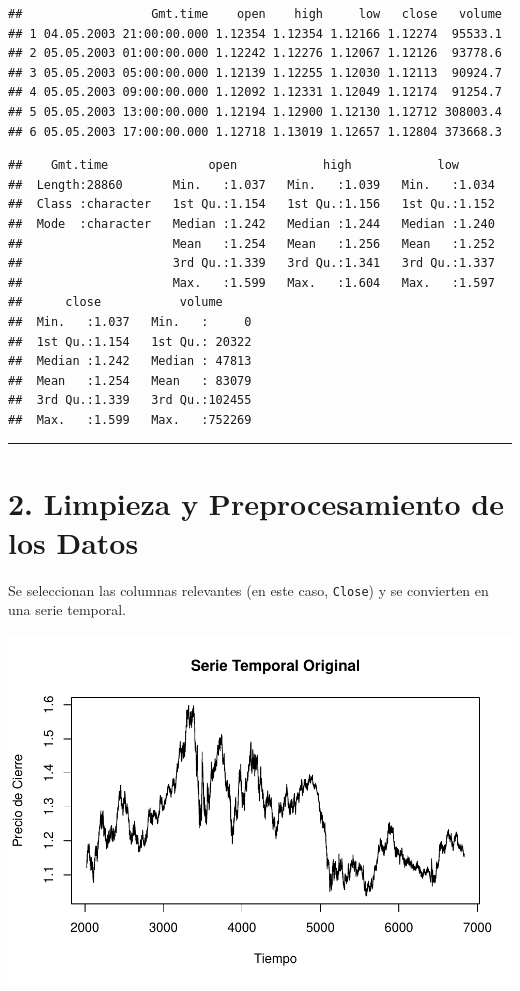 \documentclass[
]{book}
\begin{document}
\begin{verbatim}
##                  Gmt.time    open    high     low   close   volume
## 1 04.05.2003 21:00:00.000 1.12354 1.12354 1.12166 1.12274  95533.1
## 2 05.05.2003 01:00:00.000 1.12242 1.12276 1.12067 1.12126  93778.6
## 3 05.05.2003 05:00:00.000 1.12139 1.12255 1.12030 1.12113  90924.7
## 4 05.05.2003 09:00:00.000 1.12092 1.12331 1.12049 1.12174  91254.7
## 5 05.05.2003 13:00:00.000 1.12194 1.12900 1.12130 1.12712 308003.4
## 6 05.05.2003 17:00:00.000 1.12718 1.13019 1.12657 1.12804 373668.3
\end{verbatim}

\begin{verbatim}
##    Gmt.time              open            high            low       
##  Length:28860       Min.   :1.037   Min.   :1.039   Min.   :1.034  
##  Class :character   1st Qu.:1.154   1st Qu.:1.156   1st Qu.:1.152  
##  Mode  :character   Median :1.242   Median :1.244   Median :1.240  
##                     Mean   :1.254   Mean   :1.256   Mean   :1.252  
##                     3rd Qu.:1.339   3rd Qu.:1.341   3rd Qu.:1.337  
##                     Max.   :1.599   Max.   :1.604   Max.   :1.597  
##      close           volume      
##  Min.   :1.037   Min.   :     0  
##  1st Qu.:1.154   1st Qu.: 20322  
##  Median :1.242   Median : 47813  
##  Mean   :1.254   Mean   : 83079  
##  3rd Qu.:1.339   3rd Qu.:102455  
##  Max.   :1.599   Max.   :752269
\end{verbatim}

\begin{center}\rule{0.5\linewidth}{0.5pt}\end{center}

\section{2. Limpieza y Preprocesamiento de los Datos}\label{limpieza-y-preprocesamiento-de-los-datos}

Se seleccionan las columnas relevantes (en este caso, \texttt{Close}) y se convierten en una serie temporal.

\includegraphics{bookdown_time_series_files/figure-latex/clean-data-1.pdf}
\end{document}

